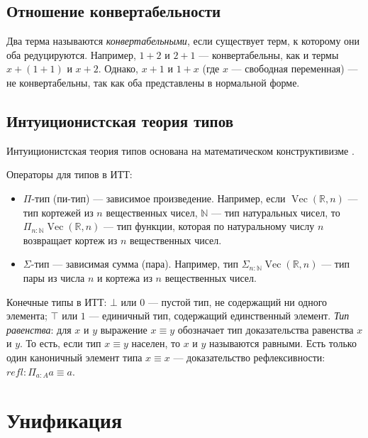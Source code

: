 \subsection{Отношение конвертабельности}

Два терма называются \emph{конвертабельными}, если существует терм, к которому
они оба редуцируются. Например, $1+2$ и $2+1$ — конвертабельны, как и термы
$x + (1 + 1)$ и $x + 2$. Однако, $x+1$ и $1+x$ (где $x$ — свободная переменная)
— не конвертабельны, так как оба представлены в нормальной форме.

\subsection{Интуиционистская теория типов}

Интуиционистская теория типов основана на математическом конструктивизме \cite{MLTT}.

Операторы для типов в ИТТ:
\begin{itemize}
    \item $\Pi$-тип (пи-тип) — зависимое произведение.
        Например, если $\operatorname{Vec}({\mathbb R}, n)$ — тип кортежей из $n$ вещественных чисел,
        $\mathbb N$ — тип натуральных чисел, то
        $\Pi_{n \mathbin{:} {\mathbb N}} \operatorname{Vec}({\mathbb R}, n)$ 
        — тип функции, которая по натуральному числу $n$ возвращает кортеж из
        $n$ вещественных чисел.
    \item $\Sigma$-тип — зависимая сумма (пара).
        Например, тип $\Sigma_{n \mathbin{:} {\mathbb N}} \operatorname{Vec}({\mathbb R}, n)$ — тип 
        пары из числа $n$ и кортежа из $n$ вещественных чисел.
\end{itemize}
Конечные типы в ИТТ:
$\bot$ или $0$ — пустой тип, не содержащий ни одного элемента;
$\top$ или $1$ — единичный тип, содержащий единственный элемент.
\emph{Тип равенства}: для $x$ и $y$ выражение
$x \equiv y$ обозначает тип доказательства равенства $x$ и $y$.
То есть, если тип $x \equiv y$ населен, то $x$ и $y$ называются равными.
Есть только один каноничный элемент типа $x \equiv x$ — доказательство
рефлексивности: $refl : \Pi_{a : A} a \equiv a $.

\section{Унификация}


